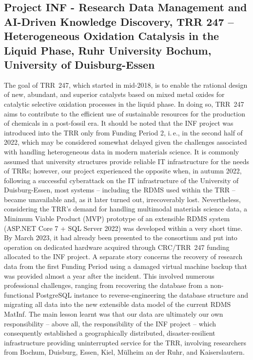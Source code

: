 \documentclass{eceasst}
\newcommand{\ie}{i.\,e.}
\begin{document}
\subsection{Project INF - Research Data Management and AI-Driven Knowledge Discovery, TRR 247 – Heterogeneous Oxidation Catalysis in the Liquid Phase, Ruhr University Bochum, University of Duisburg-Essen}
The goal of TRR~247, which started in mid-2018, is to enable the rational design of new, abundant, and superior catalysts based on mixed metal oxides for catalytic selective oxidation processes in the liquid phase.
In doing so, TRR~247 aims to contribute to the efficient use of sustainable resources for the production of chemicals in a post-fossil era.
It should be noted that the INF project was introduced into the TRR only from Funding Period 2, \ie, in the second half of 2022, which may be considered somewhat delayed given the challenges associated with handling heterogeneous data in modern materials science.
It is commonly assumed that university structures provide reliable IT infrastructure for the needs of TRRs; however, our project experienced the opposite when, in autumn 2022, following a successful cyberattack on the IT infrastructure of the University of Duisburg-Essen, most systems – including the RDMS used within the TRR – became unavailable and, as it later turned out, irrecoverably lost.
Nevertheless, considering the TRR’s demand for handling multimodal materials science data, a Minimum Viable Product (MVP) prototype of an extensible RDMS system (ASP.NET Core 7 + SQL Server 2022) was developed within a very short time.
By March 2023, it had already been presented to the consortium and put into operation on dedicated hardware acquired through CRC/TRR~247 funding allocated to the INF project.
A separate story concerns the recovery of research data from the first Funding Period using a damaged virtual machine backup that was provided almost a year after the incident.
This involved numerous professional challenges, ranging from recovering the database from a non-functional PostgreSQL instance to reverse-engineering the database structure and migrating all data into the new extensible data model of the current RDMS MatInf.
The main lesson learnt was that our data are ultimately our own responsibility – above all, the responsibility of the INF project – which consequently established a geographically distributed, disaster-resilient infrastructure providing uninterrupted service for the TRR, involving researchers from Bochum, Duisburg, Essen, Kiel, Mülheim an der Ruhr, and Kaiserslautern.
\end{document}
